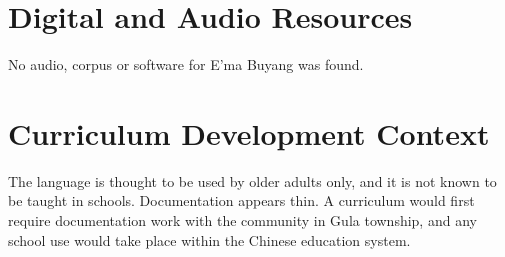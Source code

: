 \documentclass[12pt]{article}
\begin{document}
\section{Digital and Audio Resources}
No audio, corpus or software for E'ma Buyang was found.

\section{Curriculum Development Context}
The language is thought to be used by older adults only, and it is not known to be taught in schools. Documentation appears thin. A curriculum would first require documentation work with the community in Gula township, and any school use would take place within the Chinese education system.
\end{document}
